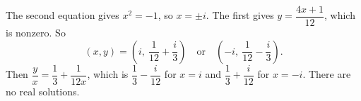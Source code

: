 The second equation gives $x^2=-1$, so $x=\pm i$. The first gives $y=\dfrac{4x+1}{12}$, which is nonzero. So
\[(x,y)=\left(i,\ \dfrac{1}{12}+\dfrac i3\right)\quad\text{or}\quad\left(-i,\ \dfrac{1}{12}-\dfrac i3\right).\]
Then $\dfrac yx=\dfrac13+\dfrac{1}{12x}$, which is $\boxed{\dfrac13-\dfrac{i}{12}}$ for $x=i$ and $\boxed{\dfrac13+\dfrac{i}{12}}$ for $x=-i$. There are no real solutions.
